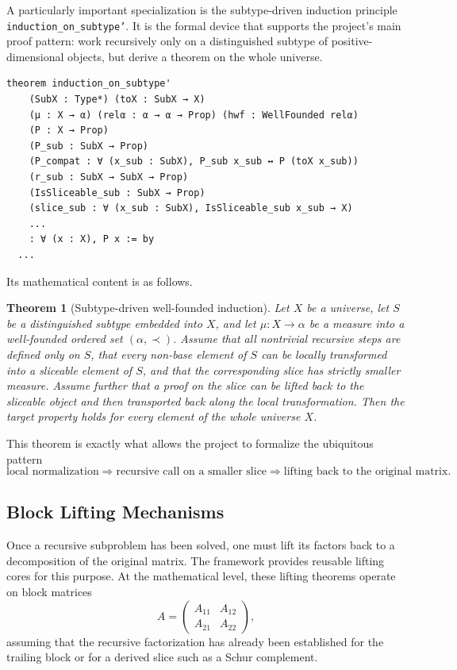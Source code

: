 \documentclass[pdflatex,sn-mathphys-num]{sn-jnl}%
\theoremstyle{thmstyleone}%
\newtheorem{theorem}{Theorem}%
\theoremstyle{thmstyletwo}%
\theoremstyle{thmstylethree}%
\begin{document}
A particularly important specialization is the subtype-driven induction principle \texttt{induction\_on\_subtype'}.  It is the formal device that supports the project's main proof pattern: work recursively only on a distinguished subtype of positive-dimensional objects, but derive a theorem on the whole universe.

\begin{lstlisting}
theorem induction_on_subtype'
    (SubX : Type*) (toX : SubX → X)
    (μ : X → α) (relα : α → α → Prop) (hwf : WellFounded relα)
    (P : X → Prop)
    (P_sub : SubX → Prop)
    (P_compat : ∀ (x_sub : SubX), P_sub x_sub ↔ P (toX x_sub))
    (r_sub : SubX → SubX → Prop)
    (IsSliceable_sub : SubX → Prop)
    (slice_sub : ∀ (x_sub : SubX), IsSliceable_sub x_sub → X)
    ...
    : ∀ (x : X), P x := by
  ...
\end{lstlisting}

Its mathematical content is as follows.

\begin{theorem}[Subtype-driven well-founded induction]
Let \(X\) be a universe, let \(S\) be a distinguished subtype embedded into \(X\), and let \(\mu : X \to \alpha\) be a measure into a well-founded ordered set \((\alpha,\prec)\).  Assume that all nontrivial recursive steps are defined only on \(S\), that every non-base element of \(S\) can be locally transformed into a sliceable element of \(S\), and that the corresponding slice has strictly smaller measure.  Assume further that a proof on the slice can be lifted back to the sliceable object and then transported back along the local transformation.  Then the target property holds for every element of the whole universe \(X\).
\end{theorem}

This theorem is exactly what allows the project to formalize the ubiquitous pattern
\[
\text{local normalization}
\Longrightarrow
\text{recursive call on a smaller slice}
\Longrightarrow
\text{lifting back to the original matrix}.
\]

\subsection{Block Lifting Mechanisms}

Once a recursive subproblem has been solved, one must lift its factors back to a decomposition of the original matrix.  The framework provides reusable lifting cores for this purpose.  At the mathematical level, these lifting theorems operate on block matrices
\[
A =
\begin{pmatrix}
A_{11} & A_{12}\\
A_{21} & A_{22}
\end{pmatrix},
\]
assuming that the recursive factorization has already been established for the trailing block or for a derived slice such as a Schur complement.
\end{document}
